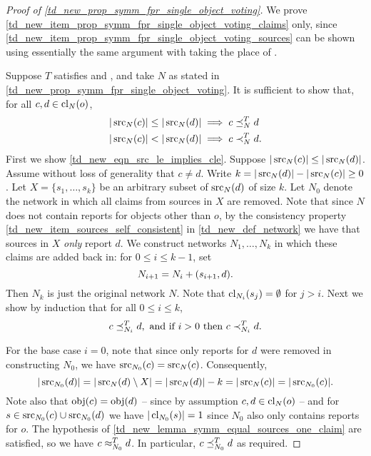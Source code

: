 \begin{proof}[Proof of \cref{td_new_prop_symm_fpr_single_object_voting}]
    We prove \cref{td_new_item_prop_symm_fpr_single_object_voting_claims} only,
    since \cref{td_new_item_prop_symm_fpr_single_object_voting_sources} can be
    shown using essentially the same argument with \sourceposresp{} taking the
    place of \freshposresp{}.

    Suppose $T$ satisfies \symmetry{} and \freshposresp{}, and take $N$ as
    stated in \cref{td_new_prop_symm_fpr_single_object_voting}. It is
    sufficient to show that, for all $c, d \in \operatorname{cl}_N(o)$,
    \begin{align}
        \label{td_new_eqn_src_le_implies_cle}
        |\operatorname{src}_N(c)| \le |\operatorname{src}_N(d)| &\implies c \preceq_N^T d \\
        \label{td_new_eqn_src_lt_implies_clt}
        |\operatorname{src}_N(c)| < |\operatorname{src}_N(d)| &\implies c \prec_N^T d.
    \end{align}
    First we show \cref{td_new_eqn_src_le_implies_cle}. Suppose $|\operatorname{src}_N(c)|
    \le |\operatorname{src}_N(d)|$. Assume without loss of generality that $c \ne d$. Write
    $k = |\operatorname{src}_N(d)| - |\operatorname{src}_N(c)| \ge 0$. Let $X = \{s_1, \ldots, s_k\}$ be an
    arbitrary subset of $\operatorname{src}_N(d)$ of size $k$. Let $N_0$ denote the network
    in which all claims from sources in $X$ are removed. Note that since $N$
    does not contain reports for objects other than $o$, by the consistency
    property \cref{td_new_item_sources_self_consistent} in
    \cref{td_new_def_network} we have that sources in $X$ \emph{only} report
    $d$.  We construct networks $N_1, \ldots, N_k$ in which these claims are
    added back in: for $0 \le i
    \le k - 1$, set
    \[
        N_{i + 1} = {N_i} + ({s_{i + 1}}, {d}).
    \]
    Then $N_k$ is just the original network $N$. Note that $\operatorname{cl}_{N_i}(s_j)
    = \emptyset$ for $j > i$. Next we show by induction that for all $0 \le i
    \le k$,
    \begin{equation}
        \label{td_new_eqn_inductive_property}
        c \preceq_{N_i}^T d, \text{ and if } i > 0 \text{ then }
        c \prec_{N_i}^T d.
    \end{equation}

    For the base case $i = 0$, note that since only reports for $d$ were
    removed in constructing $N_0$, we have $\operatorname{src}_{N_0}(c) = \operatorname{src}_N(c)$.
    Consequently,
    \[
        |\operatorname{src}_{N_0}(d)|
        = |\operatorname{src}_N(d) \setminus X|
        = |\operatorname{src}_N(d)| - k
        = |\operatorname{src}_N(c)|
        = |\operatorname{src}_{N_0}(c)|.
    \]
    Note also that $\operatorname{obj}(c) = \operatorname{obj}(d)$ -- since by assumption $c, d \in
    \operatorname{cl}_N(o)$ -- and for $s \in \operatorname{src}_{N_0}(c) \cup \operatorname{src}_{N_0}(d)$ we have
    $|\operatorname{cl}_{N_0}(s)| = 1$ since $N_0$ also only contains reports for $o$.
    The hypothesis of \cref{td_new_lemma_symm_equal_sources_one_claim} are
    satisfied, so we have $c \approx_{N_0}^T d$. In particular, $c \preceq_{N_0}^T d$
    as required.


\end{proof}
